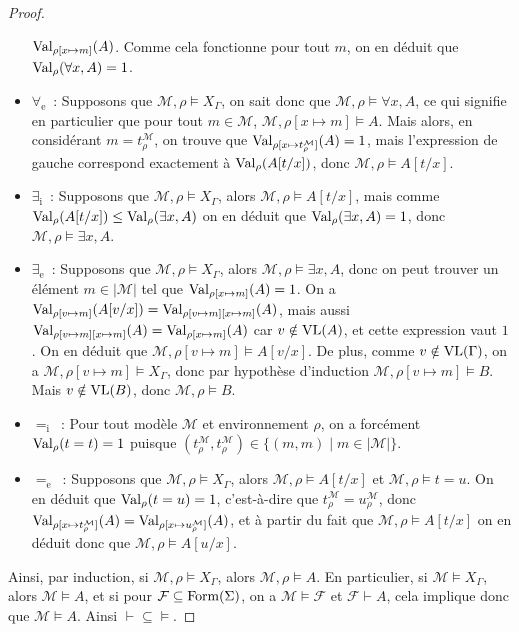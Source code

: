 \begin{proof}
\begin{itemize}
    $\operatorname{Val}_{\rho[x\mapsto m]}(A)$. Comme cela fonctionne pour tout $m$, on en
    déduit que $\operatorname{Val}_\rho(\forall x, A) = 1$.
  \item $\forall_\mathrm e$~: Supposons que $\mathcal M, \rho\models X_\Gamma$, on
    sait donc que $\mathcal M,\rho\models \forall x, A$, ce qui signifie en
    particulier que pour tout $m\in\mathcal M$,
    $\mathcal M,\rho[x\mapsto m]\models A$.
    Mais alors, en considérant $m = t^\mathcal M_\rho$, on trouve que
    $\operatorname{Val}_{\rho[x\mapsto t^\mathcal M_\rho]}(A) = 1$, mais l'expression de gauche
    correspond exactement à $\operatorname{Val}_\rho(A[t/x])$, donc
    $\mathcal M,\rho\models A[t/x]$.
  \item $\exists_\mathrm i$~: Supposons que $\mathcal M,\rho\models X_\Gamma$,
    alors $\mathcal M,\rho\models A[t/x]$, mais comme
    $\operatorname{Val}_\rho(A[t/x])\leq\operatorname{Val}_\rho(\exists x,A)$ on en déduit que
    $\operatorname{Val}_\rho(\exists x,A) = 1$, donc $\mathcal M,\rho\models \exists x,A$.
  \item $\exists_\mathrm e$~: Supposons que $\mathcal M,\rho\models X_\Gamma$,
    alors $\mathcal M,\rho\models \exists x,A$, donc on peut trouver un élément
    $m\in|\mathcal M|$ tel que $\operatorname{Val}_{\rho[x\mapsto m]}(A) = 1$. On a
    $\operatorname{Val}_{\rho[v\mapsto m]}(A[v/x]) = \operatorname{Val}_{\rho[v\mapsto m][x\mapsto m]}(A)$, mais
    aussi $\operatorname{Val}_{\rho[v\mapsto m][x\mapsto m]}(A) = \operatorname{Val}_{\rho[x\mapsto m]}(A)$
    car $v\notin\operatorname{VL}(A)$, et cette expression vaut $1$. On en déduit que
    $\mathcal M,\rho[v\mapsto m]\models A[v/x]$. De plus, comme
    $v\notin\operatorname{VL}(\Gamma)$, on a $\mathcal M,\rho[v\mapsto m]\models X_\Gamma$,
    donc par hypothèse d'induction $\mathcal M,\rho[v\mapsto m]\models B$.
    Mais $v\notin\operatorname{VL}(B)$, donc $\mathcal M,\rho\models B$.
  \item $=_\mathrm i$~: Pour tout modèle $\mathcal M$ et environnement $\rho$, on
    a forcément $\operatorname{Val}_\rho(t=t) = 1$ puisque
    $(t^\mathcal M_\rho,t^\mathcal M_\rho)\in\{(m,m)\mid m\in|\mathcal M|\}$.
  \item $=_\mathrm e$~: Supposons que $\mathcal M,\rho\models X_\Gamma$, alors
    $\mathcal M,\rho\models A[t/x]$ et $\mathcal M,\rho\models t = u$. On en
    déduit que $\operatorname{Val}_\rho(t = u) = 1$, c'est-à-dire que
    $t^\mathcal M_\rho = u^\mathcal M_\rho$, donc
    $\operatorname{Val}_{\rho[x\mapsto t^\mathcal M_\rho]}(A) = \operatorname{Val}_{\rho[x\mapsto u^\mathcal M_\rho]}(A)$,
    et à partir du fait que $\mathcal M,\rho\models A[t/x]$ on en déduit donc
    que $\mathcal M,\rho\models A[u/x]$.
  \end{itemize}

  Ainsi, par induction, si $\mathcal M,\rho\models X_\Gamma$, alors
  $\mathcal M,\rho\models A$. En particulier, si $\mathcal M\models X_\Gamma$,
  alors $\mathcal M\models A$, et si pour
  $\mathcal F\subseteq \operatorname{Form}(\Sigma)$, on a
  $\mathcal M\models \mathcal F$ et $\mathcal F\vdash A$, cela implique donc que
  $\mathcal M\models A$. Ainsi $\vdash\subseteq\vDash$.
\end{proof}

